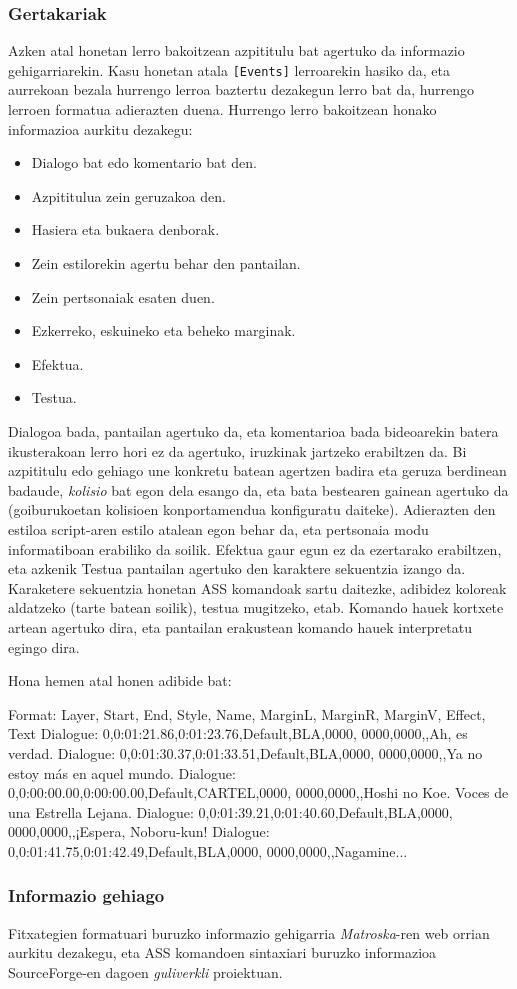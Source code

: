 \subsubsection{Gertakariak}
Azken atal honetan lerro bakoitzean azpititulu bat agertuko da informazio gehigarriarekin. Kasu honetan atala \texttt{[Events]} lerroarekin hasiko da, eta aurrekoan bezala hurrengo lerroa baztertu dezakegun lerro bat da, hurrengo lerroen formatua adierazten duena. Hurrengo lerro bakoitzean honako informazioa aurkitu dezakegu:
\begin{itemize}
	\item Dialogo bat edo komentario bat den.
	\item Azpititulua zein geruzakoa den.
	\item Hasiera eta bukaera denborak.
	\item Zein estilorekin agertu behar den pantailan.
	\item Zein pertsonaiak esaten duen.
	\item Ezkerreko, eskuineko eta beheko marginak.
	\item Efektua.
	\item Testua.
\end{itemize}
Dialogoa bada, pantailan agertuko da, eta komentarioa bada bideoarekin batera ikusterakoan lerro hori ez da agertuko, iruzkinak jartzeko erabiltzen da. Bi azpititulu edo gehiago une konkretu batean agertzen badira eta geruza berdinean badaude, \textit{kolisio} bat egon dela esango da, eta bata bestearen gainean agertuko da (goiburukoetan kolisioen konportamendua konfiguratu daiteke). Adierazten den estiloa script-aren estilo atalean egon behar da, eta pertsonaia modu informatiboan erabiliko da soilik. Efektua gaur egun ez da ezertarako erabiltzen, eta azkenik Testua pantailan agertuko den karaktere sekuentzia izango da. Karaketere sekuentzia honetan ASS komandoak sartu daitezke, adibidez koloreak aldatzeko (tarte batean soilik), testua mugitzeko, etab. Komando hauek kortxete artean agertuko dira, eta pantailan erakustean komando hauek interpretatu egingo dira.

Hona hemen atal honen adibide bat:
\begin{verbatimtab}[8]
[Events]
Format:  Layer, Start, End, Style, Name, MarginL,
	  MarginR, MarginV, Effect, Text
Dialogue: 0,0:01:21.86,0:01:23.76,Default,BLA,0000,
		0000,0000,,Ah, es verdad.
Dialogue: 0,0:01:30.37,0:01:33.51,Default,BLA,0000,
		0000,0000,,Ya no estoy más en aquel mundo.
Dialogue: 0,0:00:00.00,0:00:00.00,Default,CARTEL,0000,
		0000,0000,,Hoshi no Koe. Voces de una 
			   Estrella Lejana.
Dialogue: 0,0:01:39.21,0:01:40.60,Default,BLA,0000,
		0000,0000,,¡Espera, Noboru-kun!
Dialogue: 0,0:01:41.75,0:01:42.49,Default,BLA,0000,
		0000,0000,,Nagamine...
\end{verbatimtab}

\subsubsection{Informazio gehiago}
Fitxategien formatuari buruzko informazio gehigarria \textit{Matroska}-ren web orrian\cite{ma:ass} aurkitu dezakegu, eta ASS komandoen sintaxiari buruzko informazioa SourceForge-en dagoen \textit{guliverkli} proiektuan\cite{gu:ass}.
